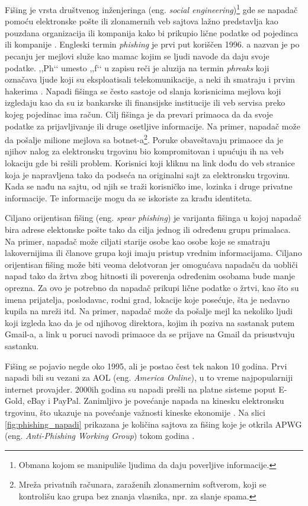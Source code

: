 \documentclass[a4paper]{article}
\theoremstyle{break}
\begin{document}
{Fišing je vrsta društvenog inženjeringa (eng. {\em social engineering})\footnote{Obmana kojom se manipuliše ljudima da daju poverljive informacije.} gde se napadač pomoću elektronske pošte ili zlonamernih veb sajtova lažno predstavlja kao pouzdana organizacija ili kompanija kako bi prikupio lične podatke od pojedinca ili kompanije \cite{phishing_us_cert}. Engleski termin {\em  phishing} je prvi put koriščen 1996. a nazvan je po pecanju jer mejlovi služe kao mamac kojim se ljudi navode da daju svoje podatke. ,,Ph‘‘ umesto ,,f‘‘ u zapisu reči je aluzija na termin {\em phreaks} koji označava ljude koji su eksploatisali telekomunikacije, a neki ih smatraju i prvim hakerima \cite{phishing_org}.
Napadi fišinga se često sastoje od slanja korisnicima mejlova koji izgledaju kao da su iz bankarske ili finansijske institucije ili veb servisa preko kojeg pojedinac ima račun. Cilj fišinga je da prevari primaoca da da svoje podatke za prijavljivanje ili druge osetljive informacije. 
Na primer, napadač može da pošalje milione mejlova sa botnet-a\footnote{Mreža privatnih računara, zaraženih zlonamernim softverom, koji se kontrolišu kao grupa bez znanja vlasnika, npr. za slanje spama.}. Poruke obaveštavaju primaoce da je njihov nalog za elektronsku trgovinu bio kompromitovan i upućuju ih na veb lokaciju gde bi rešili problem. Korisnici koji kliknu na link dođu do veb stranice koja je napravljena tako da podseća na originalni sajt za elektronsku trgovinu. Kada se nađu na sajtu, od njih se traži korisničko ime, lozinka i druge privatne informacije. Te informacije mogu da se iskoriste za krađu identiteta.

Ciljano orijentisan fišing (eng. {\em spear phishing}) je varijanta fišinga u kojoj napadač bira adrese elektonske pošte tako da cilja jednog ili određenu grupu primalaca. Na primer, napadač može ciljati starije osobe kao osobe koje se smatraju lakovernijima ili članove grupa koji imaju pristup vrednim informacijama. Ciljano orijentisan fišing može biti veoma delotvoran jer omogućava napadaču da uobliči napad tako da žrtva zbog hitnosti ili poverenja određenim osobama bude manje oprezna. Za ovo je potrebno da napadač prikupi lične podatke o žrtvi, kao što su imena prijatelja, poslodavac, rodni grad, lokacije koje posećuje, šta je nedavno kupila na mreži itd.
Na primer, napadač može da pošalje mejl ka nekoliko ljudi koji izgleda kao da je od njihovog direktora, kojim ih poziva na sastanak putem Gmail-a, a link u poruci navodi primaoce da se prijave na Gmail da prisustvuju sastanku. 

Fišing se pojavio negde oko 1995, ali je postao čest tek nakon 10 godina. Prvi napadi bili su vezani za AOL (eng. {\em America Online}), u to vreme najpopularniji internet provajder\cite {phishing_aol}. 2000ih godina su napadi prešli na platne sisteme poput E-Gold, eBay i PayPal.
Zanimljivo je povećanje napada na kinesku elektronsku trgovinu, što ukazuje na povećanje važnosti kineske ekonomije \cite{knjiga}.
Na slici \ref{fig:phishing_napadi} prikazana je količina sajtova za fišing koje je otkrila APWG (eng. {\em Anti-Phishing Working Group}) tokom godina \cite{apwg}.

}
\end{document}
